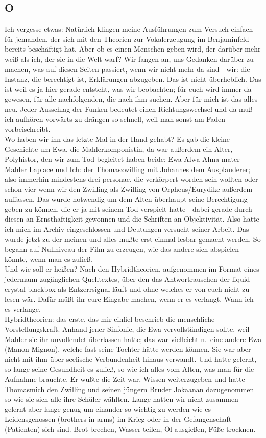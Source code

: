 \documentclass[
]{article}
\author{}
\date{\vspace{-2.5em}}
\begin{document}
\subsection{O}\label{o}

Ich vergesse etwas: Natürlich klingen meine Ausführungen zum Versuch
einfach für jemanden, der sich mit den Theorien zur Vokalerzeugung im
Benjaminfeld bereits beschäftigt hat. Aber ob es einen Menschen geben
wird, der darüber mehr weiß als ich, der sie in die Welt warf? Wir
fangen an, uns Gedanken darüber zu machen, was auf diesen Seiten
passiert, wenn wir nicht mehr da sind - wir: die Instanz, die berechtigt
ist, Erklärungen abzugeben. Das ist nicht überheblich. Das ist weil es
ja hier gerade entsteht, was wir beobachten; für euch wird immer da
gewesen, für alle nachfolgenden, die nach ihm suchen. Aber für mich ist
das alles neu. Jeder Ausschlag der Funken bedeutet einen
Richtungswechsel und da muß ich aufhören vorwärts zu drängen so schnell,
weil man sonst am Faden vorbeischreibt.\\
Wo haben wir ihn das letzte Mal in der Hand gehabt? Es gab die kleine
Geschichte um Ewa, die Mahlerkomponistin, da war außerdem ein Alter,
Polyhistor, den wir zum Tod begleitet haben beide: Ewa Alwa Alma mater
Mahler Laplace und Ich: der Thomaszwilling mit Johannes dem
Ausplauderer; also immerhin mindestens drei personae, die verkörpert
worden sein wollten oder schon vier wenn wir den Zwilling als Zwilling
von Orpheus/Eurydike außerdem auffassen. Das wurde notwendig um dem
Alten überhaupt seine Berechtigung geben zu können, die er ja mit seinem
Tod verspielt hatte - dabei gerade durch diesen an Ernsthaftigkeit
gewonnen und die Schriften an Objektivität. Also hatte ich mich im
Archiv eingeschlossen und Deutungen versucht seiner Arbeit. Das wurde
jetzt zu der meinen und alles mußte erst einmal lesbar gemacht werden.
So begann auf Nullniveau der Film zu erzeugen, wie das andere sich
abspielen könnte, wenn man es zuließ.\\
Und wie soll er heißen? Nach den Hybridtheorien, aufgenommen im Format
eines jedermann zugänglichen Quelltextes, über den das Antwortrauschen
der liquid crystal blackbox als Entzerrsignal läuft und ohne welches er
von euch nicht zu lesen wär. Dafür müßt ihr eure Eingabe machen, wenn er
es verlangt. Wann ich es verlange.\\
Hybridtheorien: das erste, das mir einfiel beschrieb die menschliche
Vorstellungskraft. Anhand jener Sinfonie, die Ewa vervollständigen
sollte, weil Mahler sie ihr unvollendet überlassen hatte; das war
vielleicht n.~eine andere Ewa (Manon-Mignon), welche fast seine Tochter
hätte werden können. Sie war aber nicht mit ihm über seelische
Verbundenheit hinaus verwandt. Und hatte gelernt, so lange seine
Gesundheit es zuließ, so wie ich alles vom Alten, was man für die
Aufnahme brauchte. Er wußte die Zeit war, Wissen weiterzugeben und hatte
Thomasmich den Zwilling und seinen jüngern Bruder Jokaanan dazugenommen
so wie sie sich alle ihre Schüler wählten. Lange hatten wir nicht
zusammen gelernt aber lange genug um einander so wichtig zu werden wie
es Leidensgenossen (brothers in arms) im Krieg oder in der
Gefangenschaft (Patienten) sich sind. Brot brechen, Wasser teilen, Öl
ausgießen, Füße trocknen.
\end{document}
